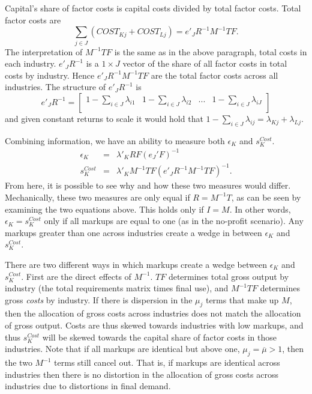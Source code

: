 \documentclass[11pt]{article}
\begin{document}
Capital's share of factor costs is capital costs divided by total factor costs. Total factor costs are
\begin{equation}
	\sum_{j \in J} (COST_{Kj}+COST_{Lj}) = e'_J R^{-1} M^{-1} T F. 
\end{equation}
The interpretation of $M^{-1} T F$ is the same as in the above paragraph, total costs in each industry. $e'_J R^{-1}$ is a $1 \times J$ vector of the share of all factor costs in total costs by industry. Hence $e'_J R^{-1} M^{-1} T F$ are the total factor costs across all industries. The structure of $e'_J R^{-1}$ is
\begin{equation}
	e'_J R^{-1} = \begin{bmatrix}
		1 - \sum_{i \in J} \lambda_{i1} & 1 - \sum_{i \in J} \lambda_{i2} & ... & 1 - \sum_{i \in J} \lambda_{iJ}  \\
	\end{bmatrix}
\end{equation}
and given constant returns to scale it would hold that $1 - \sum_{i \in J} \lambda_{ij} = \lambda_{Kj} + \lambda_{Lj}$. 

Combining information, we have an ability to measure both $\epsilon_K$ and $s_K^{Cost}$. 
\begin{eqnarray}
	\epsilon_K &=& \lambda'_K R F \left(e_J'F\right)^{-1} \\
	s_K^{Cost} &=& \lambda'_K M^{-1} T F \left(e'_J R^{-1} M^{-1} T F \right)^{-1}.
\end{eqnarray}
From here, it is possible to see why and how these two measures would differ. Mechanically, these two measures are only equal if $R = M^{-1} T$, as can be seen by examining the two equations above. This holds only if $I = M$. In other words, $\epsilon_K = s_K^{Cost}$ only if all markups are equal to one (as in the no-profit scenario). Any markups greater than one across industries create a wedge in between $\epsilon_K$ and $s_K^{Cost}$. 

There are two different ways in which markups create a wedge between $\epsilon_K$ and $s_K^{Cost}$. First are the direct effects of $M^{-1}$. $TF$ determines total gross output by industry (the total requirements matrix times final use), and $M^{-1} TF$ determines gross \textit{costs} by industry. If there is dispersion in the $\mu_j$ terms that make up $M$, then the allocation of gross costs across industries does not match the allocation of gross output. Costs are thus skewed towards industries with low markups, and thus $s_K^{Cost}$ will be skewed towards the capital share of factor costs in those industries. Note that if all markups are identical but above one, $\mu_j = \overline{\mu} > 1$, then the two $M^{-1}$ terms still cancel out. That is, if markups are identical across industries then there is no distortion in the allocation of gross costs across industries due to distortions in final demand.
\end{document}
